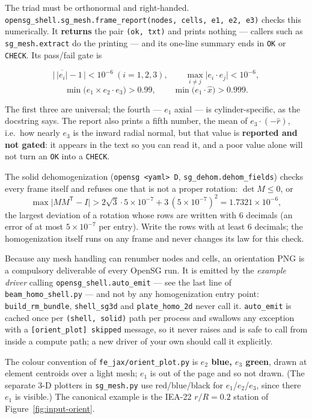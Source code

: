 The triad must be orthonormal and right-handed.
\texttt{opensg\_shell.sg\_mesh.frame\_report(nodes, cells, e1, e2, e3)} checks
this numerically. It \textbf{returns} the pair \texttt{(ok, txt)} and prints
nothing --- callers such as \texttt{sg\_mesh.extract} do the printing --- and its
one-line summary ends in \texttt{OK} or \texttt{CHECK}. Its pass/fail gate is

\[
\bigl|\,\overline{|e_i|} - 1\,\bigr| < 10^{-6}\ (i = 1,2,3), \qquad
\max_{i\neq j}\bigl|e_i \cdot e_j\bigr| < 10^{-6},
\]
\[
\min\bigl(e_1 \times e_2 \cdot e_3\bigr) > 0.99, \qquad
\min\bigl(e_1 \cdot \hat{x}\bigr) > 0.999 .
\]

The first three are universal; the fourth --- $e_1$ axial --- is
cylinder-specific, as the docstring says. The report also prints a fifth number,
the mean of $e_3 \cdot (-\hat{r})$, i.e.\ how nearly $e_3$ is the inward radial
normal, but that value is \textbf{reported and not gated}: it appears in the text
so you can read it, and a poor value alone will not turn an \texttt{OK} into a
\texttt{CHECK}.

The solid dehomogenization (\texttt{opensg <yaml> D},
\texttt{sg\_dehom.dehom\_fields}) checks every frame itself and refuses one that
is not a proper rotation: $\det M \le 0$, or
\[
\max\bigl|M M^{\mathsf T} - I\bigr| > 2\sqrt{3}\cdot 5\times10^{-7}
+ 3\,(5\times10^{-7})^2 = 1.7321\times10^{-6},
\]
the largest deviation of a rotation whose rows are written with 6 decimals (an
error of at most $5\times10^{-7}$ per entry). Write the rows with at least 6
decimals; the homogenization itself runs on any frame and never changes its law
for this check.

Because any mesh handling can renumber nodes and cells, an orientation PNG is a
compulsory deliverable of every OpenSG run. It is emitted by the \emph{example
driver} calling \texttt{opensg\_shell.auto\_emit} --- see the last line of
\texttt{beam\_homo\_shell.py} --- and not by any homogenization entry point:
\texttt{build\_rm\_bundle}, \texttt{shell\_sg3d} and \texttt{plate\_homo\_2d}
never call it. \texttt{auto\_emit} is cached once per \texttt{(shell, solid)}
path per process and swallows any exception with a
\texttt{[orient\_plot] skipped} message, so it never raises and is safe to call
from inside a compute path; a new driver of your own should call it explicitly.

The colour convention of \texttt{fe\_jax/orient\_plot.py} is \textbf{$e_2$ blue,
$e_3$ green}, drawn at element centroids over a light mesh; $e_1$ is out of the
page and so not drawn. (The separate 3-D plotters in \texttt{sg\_mesh.py} use
red/blue/black for $e_1$/$e_2$/$e_3$, since there $e_1$ is visible.) The
canonical example is the IEA-22 $r/R = 0.2$ station of
Figure~\ref{fig:input-orient}.


